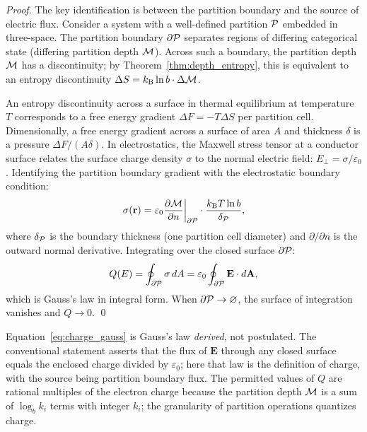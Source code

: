 \begin{proof}
The key identification is between the partition boundary and the source of
electric flux. Consider a system with a well-defined partition $\mathcal{P}$ embedded
in three-space. The partition boundary $\partial\mathcal{P}$ separates regions of
differing categorical state (differing partition depth $\mathcal{M}$). Across such
a boundary, the partition depth $\mathcal{M}$ has a discontinuity; by
Theorem~\ref{thm:depth_entropy}, this is equivalent to an entropy discontinuity
$\Delta S = k_{\mathrm{B}} \ln b \cdot \Delta\mathcal{M}$.

An entropy discontinuity across a surface in thermal equilibrium at temperature
$T$ corresponds to a free energy gradient $\Delta F = -T \Delta S$ per
partition cell. Dimensionally, a free energy gradient across a surface of
area $A$ and thickness $\delta$ is a pressure $\Delta F / (A \delta)$.
In electrostatics, the Maxwell stress tensor at a conductor surface relates
the surface charge density $\sigma$ to the normal electric field:
$E_\perp = \sigma/\varepsilon_0$. Identifying the partition boundary gradient
with the electrostatic boundary condition:
\begin{equation}
  \sigma(\mathbf{r}) = \varepsilon_0 \frac{\partial \mathcal{M}}{\partial n}\bigg|_{\partial\mathcal{P}}
    \cdot \frac{k_{\mathrm{B}} T \ln b}{\delta_{\mathcal{P}}},
  \label{eq:surface_charge_density}
\end{equation}
where $\delta_{\mathcal{P}}$ is the boundary thickness (one partition cell diameter)
and $\partial/\partial n$ is the outward normal derivative. Integrating over the
closed surface $\partial\mathcal{P}$:
\begin{equation}
  Q(E) = \oint_{\partial\mathcal{P}} \sigma\, dA = \varepsilon_0 \oint_{\partial\mathcal{P}} \mathbf{E}\cdot d\mathbf{A},
\end{equation}
which is Gauss's law in integral form. When $\partial\mathcal{P} \to \varnothing$,
the surface of integration vanishes and $Q \to 0$. \qed
\end{proof}

\begin{remark}
Equation~\eqref{eq:charge_gauss} is Gauss's law \emph{derived}, not postulated.
The conventional statement asserts that the flux of $\mathbf{E}$ through any
closed surface equals the enclosed charge divided by $\varepsilon_0$; here that
law is the definition of charge, with the source being partition boundary flux.
The permitted values of $Q$ are rational multiples of the electron charge
because the partition depth $\mathcal{M}$ is a sum of $\log_b k_i$ terms with
integer $k_i$; the granularity of partition operations quantizes charge.
\end{remark}

